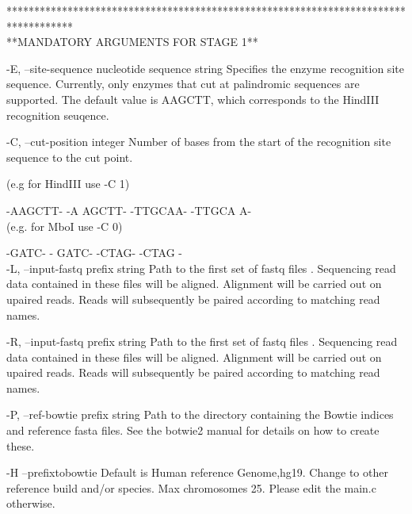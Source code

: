 \documentclass[10pt,a4paper]{article}
\begin{document}
************************************************************************************ \\
**MANDATORY ARGUMENTS FOR STAGE 1**
 
        -E, --site-sequence nucleotide sequence string    Specifies the enzyme recognition site sequence.  Currently, only enzymes that cut at palindromic sequences are supported.
                                                            The default value is AAGCTT, which corresponds to the HindIII recognition seuqence.

        -C, --cut-position integer    Number of bases from the start of the recognition site sequence to the cut point.
                                                      
                                                     
 (e.g for HindIII use -C 1)

                     -AAGCTT-    -A       AGCTT-
                     -TTGCAA-    -TTGCA       A- \\
                                                      
                                                      
  (e.g. for MboI use -C 0)

                                                    
                      -GATC-      -       GATC-
                      -CTAG-      -CTAG       -  \\

        -L, --input-fastq prefix string    Path to the first set of fastq files . Sequencing read data contained in these files will be aligned.  Alignment will be carried out on upaired reads.  
                                           Reads will subsequently be paired according to matching read names.

        -R, --input-fastq prefix string    Path to the first set of fastq files . Sequencing read data contained in these files will be aligned.  Alignment will be carried out on upaired reads.  
                                           Reads will subsequently be paired according to matching read names.

        -P, --ref-bowtie prefix string     Path to the directory containing the Bowtie indices and reference fasta files. See the botwie2 manual for details on how to create these.

        -H  --prefixtobowtie         Default is Human reference Genome,hg19. Change to other reference build and/or species. Max chromosomes 25. Please edit the main.c otherwise.
        
\end{document}

